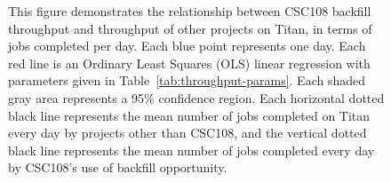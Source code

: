 \begin{figure}
  \vspace{1em}
  \caption{This figure demonstrates the relationship between CSC108 backfill
throughput and throughput of other projects on Titan, in terms of jobs
completed per day. Each blue point represents one day. Each red line is an
Ordinary Least Squares (OLS) linear regression with parameters given in
Table~\ref{tab:throughput-params}. Each shaded gray area represents a 95\%
confidence region. Each horizontal dotted black line represents the mean number
of jobs completed on Titan every day by projects other than CSC108, and the
vertical dotted black line represents the mean number of jobs completed every
day by CSC108's use of backfill opportunity.}
\end{figure}

